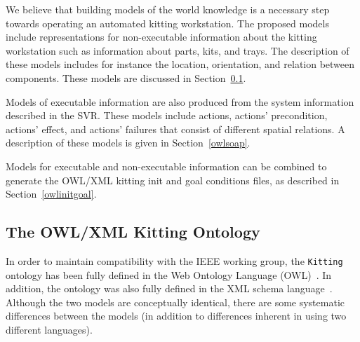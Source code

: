 We believe that building models of the world knowledge is a necessary step towards operating an automated kitting workstation. The proposed models include representations for non-executable information about the kitting workstation such as information about parts, kits, and trays. The description of these models includes for instance the location, orientation, and relation between components. These models are discussed in Section~\ref{owlkitting}.

Models of executable information are also produced from the system information described in the SVR. These models include actions, actions' precondition, actions' effect, and actions' failures that consist of different spatial relations. A description of these models is given in Section~\ref{owlsoap}.

Models for executable and non-executable information can be combined to generate the OWL/XML kitting init and goal conditions files, as described in Section~\ref{owlinitgoal}.




\subsection{The OWL/XML Kitting Ontology}\label{owlkitting}
In order to maintain compatibility with the IEEE working group, the \texttt{Kitting} ontology has been fully defined in the Web Ontology Language (OWL)~\cite{OWLoverview}. In addition, the ontology was also fully defined in the XML schema language~\cite{Walmsley.2002}. Although the two models are conceptually identical, there are some systematic differences between the models (in addition to differences inherent in using two different languages).



